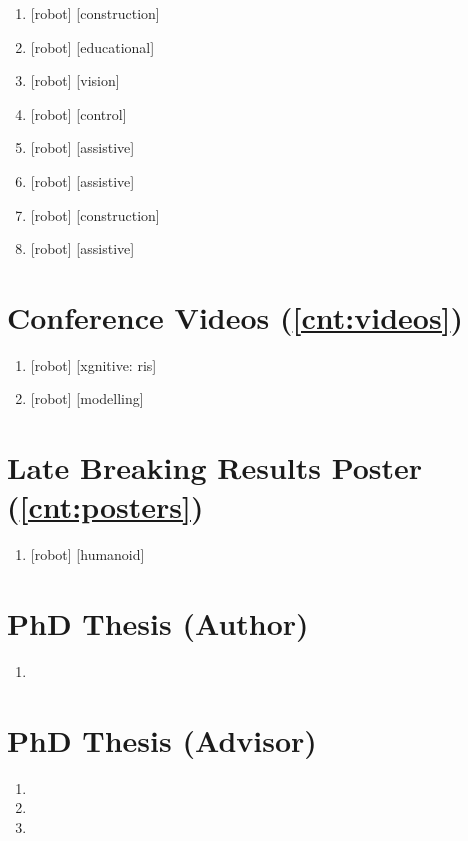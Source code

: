 \documentclass{article}
\begin{document}
\begin{enumerate}
  \item {} [robot] [construction]
  \item {} [robot] [educational]
  \item {} [robot] [vision]
  \item {} [robot] [control]
  \item {} [robot] [assistive]
  \item {} [robot] [assistive]
  \item {} [robot] [construction]
  \item \label{cnt:conferences}  [robot] [assistive]
\end{enumerate}

\section*{Conference Videos (\ref*{cnt:videos})}
\begin{enumerate}
  \item {} [robot] [xgnitive: ris]
  \item \label{cnt:videos}  [robot] [modelling]
\end{enumerate}

\section*{Late Breaking Results Poster (\ref*{cnt:posters})}
\begin{enumerate}
  \item \label{cnt:posters}  [robot] [humanoid]
\end{enumerate}

\section*{PhD Thesis (Author)}
\begin{enumerate}
  \item {}
\end{enumerate}

\section*{PhD Thesis (Advisor)}
\begin{enumerate}
  \item {}
  \item {}
  \item {}
\end{enumerate}
\end{document}
